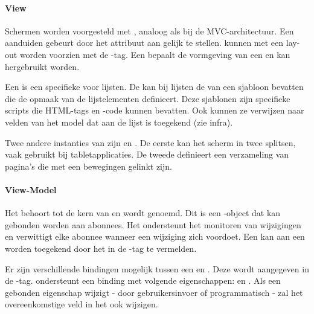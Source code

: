 \paragraph{View}
Schermen worden voorgesteld met ,  analoog als bij de MVC-architectuur.
Een  aanduiden gebeurt door het attribuut  aan  gelijk te stellen.
 kunnen met een lay-out worden voorzien met de -tag.
Een  bepaalt de vormgeving van een  en kan hergebruikt worden.

Een  is een specifieke  voor lijsten.
De  kan bij lijsten de  van een sjabloon bevatten die de opmaak van de lijstelementen definieert.
Deze sjablonen zijn specifieke \kendo{} scripts die HTML-tags en \js{}-code kunnen bevatten.
Ook kunnen ze verwijzen naar velden van het model dat aan de lijst is toegekend (zie infra).

Twee andere instanties van  zijn  en .
De eerste kan het scherm in twee  splitsen,  vaak gebruikt bij tabletapplicaties.
De tweede definieert een verzameling van pagina's die met een  bewegingen gelinkt zijn.

\paragraph{View-Model}
Het  behoort tot de kern van \kendo{} en wordt  genoemd.
Dit is een \js{}-object dat kan gebonden worden aan abonnees.
Het ondersteunt het monitoren van wijzigingen en verwittigt elke abonnee wanneer een wijziging zich voordoet.
Een  kan aan een  worden toegekend door het in de -tag te vermelden.

Er zijn verschillende bindingen	 mogelijk tussen een  en .
Deze wordt aangegeven in de -tag.
\kendo{} ondersteunt een binding met volgende eigenschappen:   en .
Als een gebonden eigenschap wijzigt - door gebruikersinvoer of programmatisch - zal het overeenkomstige veld in het  ook wijzigen.

